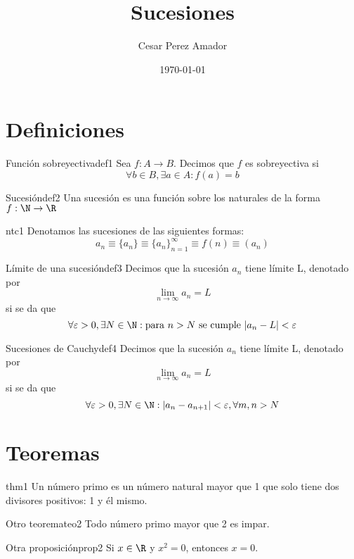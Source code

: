 \documentclass[12pt,a4paper]{article}
\title{Sucesiones}
\author{Cesar Perez Amador}
\date{\today}
\begin{document}
\maketitle

\section{Definiciones}

\begin{definicion}{Función sobreyectiva}{def1}
    Sea $f: A \to B$. Decimos que $f$ es sobreyectiva si 
    \[
        \forall b \in B, \exists a \in A: f(a) = b
    \]
\end{definicion}

\begin{definicion}{Sucesión}{def2}
    Una sucesión es una función sobre los naturales de la forma $f: \N \to \R$ 
\end{definicion}

\begin{notacion}{}{ntc1}
    Denotamos las sucesiones de las siguientes formas:
    \[ 
        a_n \equiv \{a_n\} \equiv \{a_n\}_{n = 1}^{\infty} \equiv f(n) \equiv (a_n)
    \]
\end{notacion}
    
\begin{definicion}{Límite de una sucesión}{def3}
    Decimos que la sucesión $a_n$ tiene límite L, denotado por
    \[ 
        \lim_{n \to \infty} a_n = L
    \]
    si se da que 
    \[ 
        \forall \varepsilon > 0, \exists N \in \N: \text{para } n > N \text{ se cumple } \lvert a_n - L \rvert < \varepsilon
    \]
\end{definicion}

\begin{definicion}{Sucesiones de Cauchy}{def4}
    Decimos que la sucesión $a_n$ tiene límite L, denotado por
    \[ 
        \lim_{n \to \infty} a_n = L
    \]
    si se da que 
    \[ 
        \forall \varepsilon > 0, \exists N \in \N: \lvert a_n - a_{n + 1} \rvert < \varepsilon, \forall m,n > N 
    \]
\end{definicion}

\section{Teoremas}

\begin{teorema}{}{thm1}
Un número primo es un número natural mayor que 1 que solo tiene dos divisores positivos: 1 y él mismo.
\end{teorema}

\begin{teorema}{Otro teorema}{teo2}
Todo número primo mayor que 2 es impar.
\end{teorema}

\begin{proposicion}{Otra proposición}{prop2}
Si $x \in \R$ y $x^2 = 0$, entonces $x=0$.
\end{proposicion}
\end{document}
